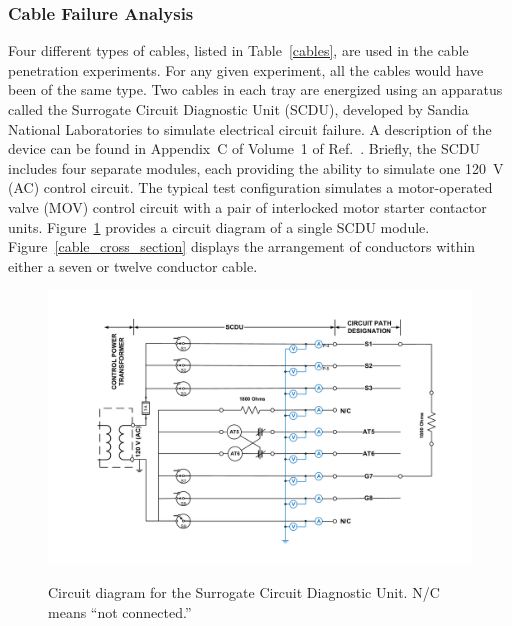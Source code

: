 \FloatBarrier

\subsubsection{Cable Failure Analysis}

Four different types of cables, listed in Table~\ref{cables}, are used in the cable penetration experiments. For any given experiment, all the cables would have been of the same type. Two cables in each tray are energized using an apparatus called the Surrogate Circuit Diagnostic Unit (SCDU), developed by Sandia National Laboratories to simulate electrical circuit failure. A description of the device can be found in Appendix~C of Volume~1 of Ref.~\cite{CAROLFIRE}. Briefly, the SCDU includes four separate modules, each providing the ability to simulate one 120~V (AC) control circuit. The typical test configuration simulates a motor-operated valve (MOV) control circuit with a pair of interlocked motor starter contactor units. Figure~\ref{circuit_diagram} provides a circuit diagram of a single SCDU module. Figure~\ref{cable_cross_section} displays the arrangement of conductors within either a seven or twelve conductor cable.

\begin{figure}[ht]
\vspace{-.4in}
\includegraphics[width=6.5in]{../FIGURES/Circuit_Drawing} \\
\vspace{-.5in}
\caption[Circuit diagram for the Surrogate Circuit Diagnostic Unit]{Circuit diagram for the Surrogate Circuit Diagnostic Unit. N/C means ``not connected.''}
\label{circuit_diagram}
\end{figure}

